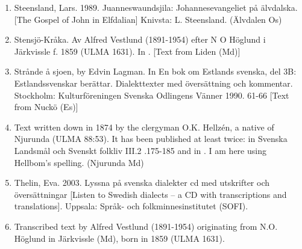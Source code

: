 \begin{enumerate}
\item[\sqbrSenum]

\label{bkm:Ref150065761}Steensland, Lars. 1989. Juanneswaundsjila: Johannesevangeliet på älvdalska. [The Gospel of John in Elfdalian] Knivsta: L. Steensland. (Älvdalen Os)

\item[\sqbrSenum]

\label{bkm:Ref154221412}\label{bkm:Ref154302630}Stensjö-Kråka. Av Alfred Vestlund (1891-1954) efter N O Höglund i Järkvissle f. 1859 (ULMA 1631). In \citet[17-19]{Hellbom1981}. [Text from Liden (Md)]

\item[\sqbrSenum]

\label{bkm:Ref223343666}Strånde å sjoen, by Edvin Lagman. In En bok om Estlands svenska, del 3B: Estlandssvenskar berättar. Dialekttexter med översättning och kommentar. Stockholm: Kulturföreningen Svenska Odlingens Vänner 1990.  61-66 [Text from Nuckö (Es)]

\item[\sqbrSenum]

Text written down in 1874 by the clergyman O.K. Hellzén, a native of Njurunda (ULMA 88:53). It has been published at least twice: in Svenska Landsmål och Svenskt folkliv III.2 .175-185 and in \citet[92-107]{Hellbom1981}. I am here using Hellbom’s spelling. (Njurunda Md)

\item[\sqbrSenum]

Thelin, Eva. 2003. Lyssna på svenska dialekter cd med utskrifter och översättningar [Listen to Swedish dialects – a CD with transcriptions and translations]. Uppsala: Språk- och folkminnesinstitutet (SOFI).


\item[\sqbrSenum]

Transcribed text by Alfred Vestlund (1891-1954) originating from N.O. Höglund in Järkvissle (Md), born in 1859 (ULMA 1631).


\end{enumerate}
